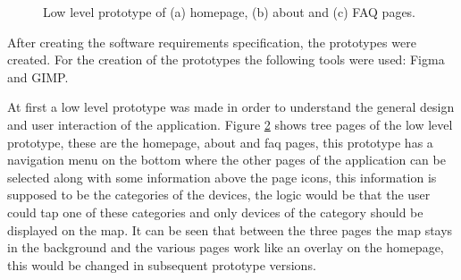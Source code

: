 \begin{figure}
\begin{subfigure}{0.33\textwidth}
        \caption{}
        \label{fig:lowfaq}
    \end{subfigure}%
    \caption{Low level prototype of (a) homepage, (b) about and (c) FAQ pages.}
    \label{fig:lowlevelprototype}
\end{figure}

After creating the software requirements specification, the prototypes were
created. For the creation of the prototypes the following tools were used: Figma
and GIMP.

At first a low level prototype was made in order to understand the
general design and user interaction of the application. Figure \ref{fig:lowlevelprototype}
shows tree pages of the low level prototype, these are the homepage, about
and faq pages, this prototype has a navigation menu on the bottom where the
other pages of the application can be selected along with some information
above the page icons, this information is supposed to be the categories of
the devices, the logic would be that the user could tap one of these categories
and only devices of the category should be displayed on the map. It can
be seen that between the three pages the map stays in the background and
the various pages work like an overlay on the homepage, this would be
changed in subsequent prototype versions.


